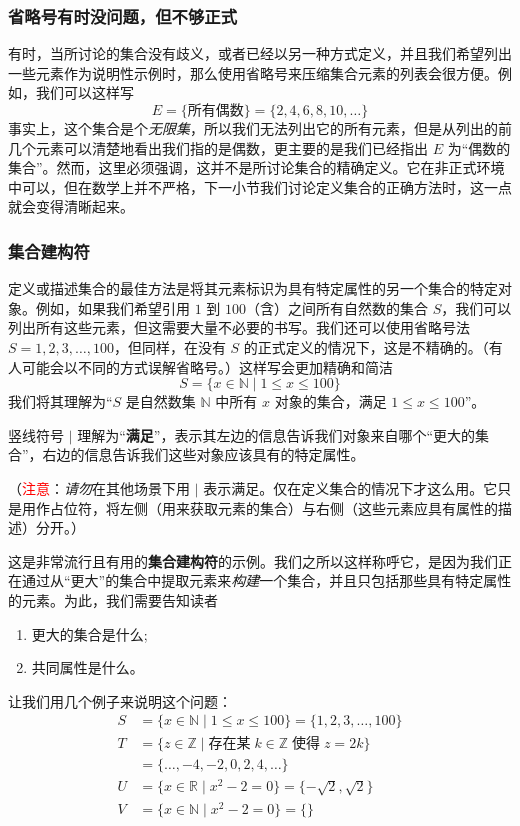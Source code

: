 \subsubsection*{省略号有时没问题，但不够正式}

有时，当所讨论的集合没有歧义，或者已经以另一种方式定义，并且我们希望列出一些元素作为说明性示例时，那么使用省略号来压缩集合元素的列表会很方便。例如，我们可以这样写
\[E = \{\text{所有偶数}\} = \{2, 4, 6, 8, 10, \dots\}\]
事实上，这个集合是个\emph{无限集}，所以我们无法列出它的所有元素，但是从列出的前几个元素可以清楚地看出我们指的是偶数，更主要的是我们已经指出 $E$ 为``偶数的集合''。然而，这里必须强调，这并不是所讨论集合的精确定义。它在非正式环境中可以，但在数学上并不严格，下一小节我们讨论定义集合的正确方法时，这一点就会变得清晰起来。

\subsubsection*{集合建构符}

定义或描述集合的最佳方法是将其元素标识为具有特定属性的另一个集合的特定对象。例如，如果我们希望引用 $1$ 到 $100$（含）之间所有自然数的集合 $S$，我们可以列出所有这些元素，但这需要大量不必要的书写。我们还可以使用省略号法 $S = {1, 2, 3, \dots , 100}$，但同样，在没有 $S$ 的正式定义的情况下，这是不精确的。（有人可能会以不同的方式误解省略号。）这样写会更加精确和简洁
\[S = \{x \in \mathbb{N} \mid 1 \le x \le 100\}\]
我们将其理解为``$S$ 是自然数集 $\mathbb{N}$ 中所有 $x$ 对象的集合，满足 $1 \le x \le 100$''。

竖线符号 $\mid$ 理解为``\textbf{满足}''，表示其左边的信息告诉我们对象来自哪个``更大的集合''，右边的信息告诉我们这些对象应该具有的特定属性。

（\textcolor{red}{注意}：\emph{请勿}在其他场景下用 $\mid$ 表示满足。仅在定义集合的情况下才这么用。它只是用作占位符，将左侧（用来获取元素的集合）与右侧（这些元素应具有属性的描述）分开。）

这是非常流行且有用的\textbf{集合建构符}的示例。我们之所以这样称呼它，是因为我们正在通过从``更大''的集合中提取元素来\emph{构建}一个集合，并且只包括那些具有特定属性的元素。为此，我们需要告知读者
\begin{enumerate}[label=(\arabic*)]
    \item 更大的集合是什么;
    \item 共同属性是什么。
\end{enumerate}
让我们用几个例子来说明这个问题：
\begin{align*}
    S &= \{x \in \mathbb{N} \mid 1 \le x \le 100\} = \{1, 2, 3, \dots , 100\} \\
    T &= \{z \in \mathbb{Z} \mid \text{存在某}\; k \in \mathbb{Z} \;\text{使得}\; z = 2k\} \\
      &= \{\dots , -4, -2, 0, 2, 4, \dots\} \\
    U &= \{x \in \mathbb{R} \mid x^2 - 2 = 0\} = \{-\sqrt{2}, \sqrt{2}\}\\
    V &= \{x \in \mathbb{N} \mid x^2 - 2 = 0\}= \{ \}
\end{align*}

